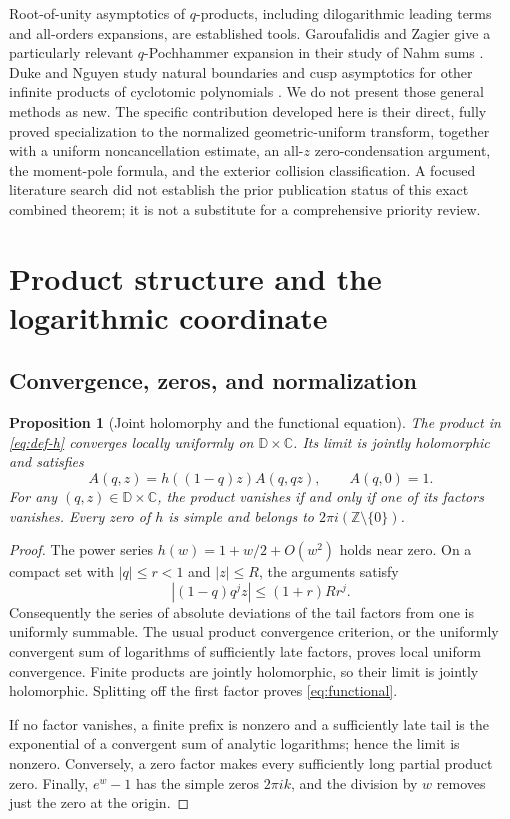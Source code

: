 \documentclass[11pt,a4paper]{article}
\numberwithin{equation}{section}
\newtheorem{proposition}[theorem]{Proposition}
\theoremstyle{definition}
\theoremstyle{remark}
\newcommand{\C}{\mathbb C}
\newcommand{\Z}{\mathbb Z}
\newcommand{\D}{\mathbb D}
\begin{document}
Root-of-unity asymptotics of \(q\)-products, including dilogarithmic leading terms and all-orders expansions, are established tools. Garoufalidis and Zagier give a particularly relevant \(q\)-Pochhammer expansion in their study of Nahm sums \cite[Lemma~2.1]{garoufalidis-zagier}. Duke and Nguyen study natural boundaries and cusp asymptotics for other infinite products of cyclotomic polynomials \cite{duke-nguyen}. We do not present those general methods as new. The specific contribution developed here is their direct, fully proved specialization to the normalized geometric-uniform transform, together with a uniform noncancellation estimate, an all-\(z\) zero-condensation argument, the moment-pole formula, and the exterior collision classification. A focused literature search did not establish the prior publication status of this exact combined theorem; it is not a substitute for a comprehensive priority review.

\section{Product structure and the logarithmic coordinate}
\subsection{Convergence, zeros, and normalization}
\begin{proposition}[Joint holomorphy and the functional equation]\label{prop:product}
The product in \eqref{eq:def-h} converges locally uniformly on \(\D\times\C\). Its limit is jointly holomorphic and satisfies
\begin{equation}\label{eq:functional}
 A(q,z)=h((1-q)z)A(q,qz),\qquad A(q,0)=1.
\end{equation}
For any \((q,z)\in\D\times\C\), the product vanishes if and only if one of its factors vanishes. Every zero of \(h\) is simple and belongs to \(2\pi i(\Z\setminus\{0\})\).
\end{proposition}
\begin{proof}
The power series \(h(w)=1+w/2+O(w^2)\) holds near zero. On a compact set with \(|q|\le r<1\) and \(|z|\le R\), the arguments satisfy
\[
 |(1-q)q^jz|\le(1+r)Rr^j.
\]
Consequently the series of absolute deviations of the tail factors from one is uniformly summable. The usual product convergence criterion, or the uniformly convergent sum of logarithms of sufficiently late factors, proves local uniform convergence. Finite products are jointly holomorphic, so their limit is jointly holomorphic. Splitting off the first factor proves \eqref{eq:functional}.

If no factor vanishes, a finite prefix is nonzero and a sufficiently late tail is the exponential of a convergent sum of analytic logarithms; hence the limit is nonzero. Conversely, a zero factor makes every sufficiently long partial product zero. Finally, \(e^w-1\) has the simple zeros \(2\pi i k\), and the division by \(w\) removes just the zero at the origin.
\end{proof}
\end{document}
